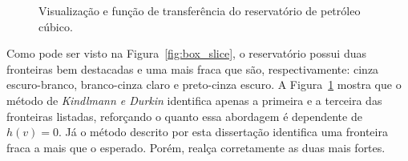 \begin{figure}[h]
	\centering
	\caption{Visualização e função de transferência do reservatório de petróleo cúbico.}
	\label{fig:r_vrep}
\end{figure}

	Como pode ser visto na Figura~\ref{fig:box_slice}, o reservatório possui duas fronteiras bem destacadas e uma mais fraca que são, respectivamente: cinza escuro-branco, branco-cinza claro e preto-cinza escuro. A Figura~\ref{fig:r_vrep} mostra que o método de \textit{Kindlmann e Durkin} identifica apenas a primeira e a terceira das fronteiras listadas, reforçando o quanto essa abordagem é dependente de $ h(v) = 0 $. Já o método descrito por esta dissertação identifica uma fronteira fraca a mais que o esperado. Porém, realça corretamente as duas mais fortes.

